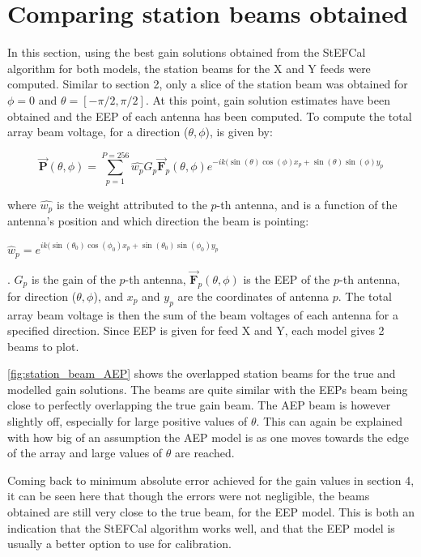 \documentclass[12pt]{report} %
\begin{document}
\section{Comparing station beams obtained}

In this section, using the best gain solutions obtained from the StEFCal algorithm for both models, the station beams for the X and Y feeds were computed. Similar to section 2, only a slice of the station beam was obtained for $\phi = 0$ and $\theta = [-\pi/2, \pi/2]$. At this point, gain solution estimates have been obtained and the EEP of each antenna has been computed. To compute the total array beam voltage, for a direction ($\theta, \phi$), is given by:

\begin{equation}
    \vec{\mathbf{P}}(\theta, \phi) = \sum_{p = 1}^{P = 256} \hat{w_{p}} G_{p} \vec{\mathbf{F}}_{p}(\theta, \phi) e^{-ik(\sin(\theta)\cos(\phi)x_{p} + \sin(\theta)\sin(\phi)y_{p}}
\end{equation}

where $\hat{w_{p}}$ is the weight attributed to the $p$-th antenna, and is a function of the antenna's position and which direction the beam is pointing:

\begin{centering}
  $\hat{w}_{p} = e^{ik(\sin(\theta_{0})\cos(\phi_{0})x_{p} + \sin(\theta_{0})\sin(\phi_{0})y_{p}}$
\end{centering}.
$G_{p}$ is the gain of the $p$-th antenna, $\vec{\mathbf{F}}_{p}(\theta, \phi)$ is the EEP of the $p$-th antenna, for direction ($\theta, \phi$), and $x_{p}$ and $y_{p}$ are the coordinates of antenna $p$. The total array beam voltage is then the sum of the beam voltages of each antenna for a specified direction. Since EEP is given for feed X and Y, each model gives 2 beams to plot.



\ref{fig:station_beam_AEP} shows the overlapped station beams for the true and modelled gain solutions. The beams are quite similar with the EEPs beam being close to perfectly overlapping the true gain beam. The AEP beam is however slightly off, especially for large positive values of $\theta$. This can again be explained with how big of an assumption the AEP model is as one moves towards the edge of the array and large values of $\theta$ are reached.

Coming back to minimum absolute error achieved for the gain values in section 4, it can be seen here that though the errors were not negligible, the beams obtained are still very close to the true beam, for the EEP model. This is both an indication that the StEFCal algorithm works well, and that the EEP model is usually a better option to use for calibration.
\end{document}
